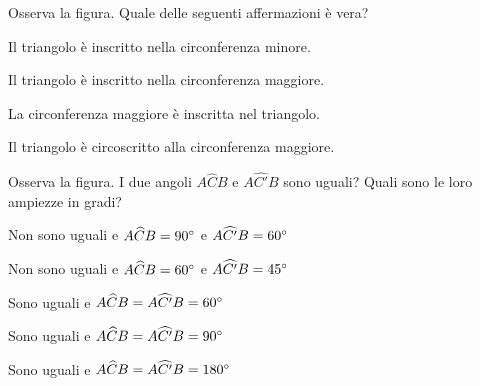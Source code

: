 \noindent\begin{minipage}{0.7\textwidth}\parindent15pt
\begin{esercizio}
\label{ese:5.60}
Osserva la figura. Quale delle seguenti affermazioni è vera?
\begin{enumeratea}
\item Il triangolo è inscritto nella circonferenza minore.
\item Il triangolo è inscritto nella circonferenza maggiore.
\item La circonferenza maggiore è inscritta nel triangolo.
\item Il triangolo è circoscritto alla circonferenza maggiore.
\end{enumeratea}
\end{esercizio}
\end{minipage}\hfil
\begin{minipage}{0.3\textwidth}
	\centering
\end{minipage}\vspace{5pt}

\noindent\begin{minipage}{0.65\textwidth}\parindent15pt
\begin{esercizio}
\label{ese:5.61}
Osserva la figura. I due angoli $A\widehat{C}B$ e $A\widehat{C'}B$ sono uguali? Quali sono le loro ampiezze in gradi?
\begin{enumeratea}
\item Non sono uguali e $A\widehat{C}B=90{}^{\circ}$ e $A\widehat{C'}B=60{}^{\circ}$
\item Non sono uguali e $A\widehat{C}B=60{}^{\circ}$ e $A\widehat{C'}B=45{}^{\circ}$
\item Sono uguali e $A\widehat{C}B=A\widehat{C'}B=60{}^{\circ}$
\item Sono uguali e $A\widehat{C}B=A\widehat{C'}B=90{}^{\circ}$
\item Sono uguali e $A\widehat{C}B=A\widehat{C'}B=180{}^{\circ}$
\end{enumeratea}
\end{esercizio}
\end{minipage}\hfil
\begin{minipage}{0.35\textwidth}
	\centering
\end{minipage}\vspace{5pt}

